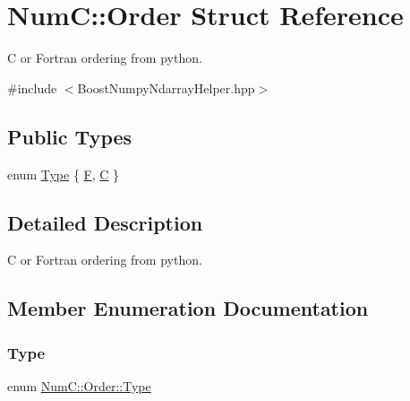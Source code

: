 \hypertarget{struct_num_c_1_1_order}{}\section{NumC\+:\+:Order Struct Reference}
\label{struct_num_c_1_1_order}


C or Fortran ordering from python.  




{\ttfamily \#include $<$Boost\+Numpy\+Ndarray\+Helper.\+hpp$>$}

\subsection*{Public Types}
\begin{DoxyCompactItemize}
\item 
enum \mbox{\hyperlink{struct_num_c_1_1_order_aec83b68303911af9c219019600b56f23}{Type}} \{ \mbox{\hyperlink{struct_num_c_1_1_order_aec83b68303911af9c219019600b56f23a32b2f0387d67915464434381e2488911}{F}}, 
\mbox{\hyperlink{struct_num_c_1_1_order_aec83b68303911af9c219019600b56f23af139755e58933d7edd13e52a9603ee6c}{C}}
 \}
\end{DoxyCompactItemize}


\subsection{Detailed Description}
C or Fortran ordering from python. 

\subsection{Member Enumeration Documentation}
\mbox{\label{struct_num_c_1_1_order_aec83b68303911af9c219019600b56f23}} 
\subsubsection{\texorpdfstring{Type}{Type}}
{\footnotesize\ttfamily enum \mbox{\hyperlink{struct_num_c_1_1_order_aec83b68303911af9c219019600b56f23}{Num\+C\+::\+Order\+::\+Type}}}

